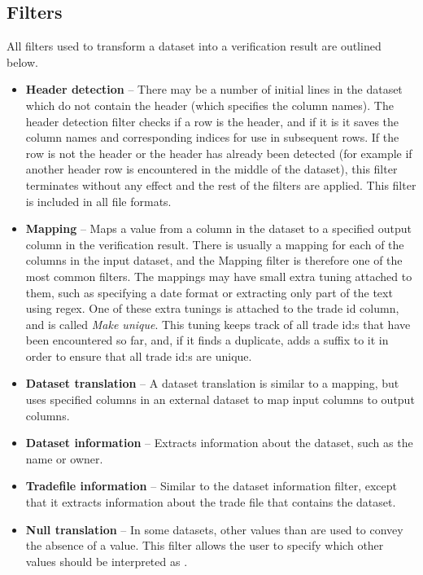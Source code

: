 \subsection{Filters}
All filters used to transform a dataset into a verification result are outlined below.

\begin{itemize}
\item \textbf{Header detection} --
There may be a number of initial lines in the dataset which do not contain the header (which specifies the column names). The header detection filter checks if a row is the header,
and if it is it saves the column names and corresponding indices for use in subsequent rows. If the row is not the header or the header has already been detected
(for example if another header row is encountered in the middle of the dataset), this filter terminates without any effect and the rest of the filters are applied.
This filter is included in all file formats.

\item \textbf{Mapping} --
Maps a value from a column in the dataset to a specified output column in the verification result. There is usually a mapping for each of the columns in the input
dataset, and the Mapping filter is therefore one of the most common filters. The mappings may have small extra tuning attached to them, such as specifying a date
format or extracting only part of the text using regex. One of these extra tunings is attached to the trade id column, and is called \textit{Make unique}.
This tuning keeps track of all trade id:s that have been encountered so far, and, if it finds a duplicate, adds a suffix to it in order to ensure that all trade id:s are unique.

\item \textbf{Dataset translation} --
A dataset translation is similar to a mapping, but uses specified columns in an external dataset to map input columns to output columns.

\item \textbf{Dataset information} --
Extracts information about the dataset, such as the name or owner.

\item \textbf{Tradefile information} --
Similar to the dataset information filter, except that it extracts information about the trade file that contains the dataset.

\item \textbf{Null translation} --
In some datasets, other values than  are used to convey the absence of a value. This filter allows the user to specify which other values
should be interpreted as .


\end{itemize}
